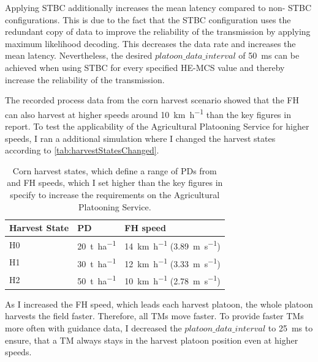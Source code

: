 Applying \ac{STBC} additionally increases the mean latency compared to
non- \ac{STBC} configurations.
This is due to the fact that the \ac{STBC} configuration uses the redundant copy of data to
improve the reliability of the transmission by applying maximum likelihood decoding.
This decreases the data rate and increases
the mean latency.
Nevertheless, the desired $platoon\_data\_interval$ of \SI{50}{\milli\second} can be achieved when using \ac{STBC} for
every specified \ac{HE}-\ac{MCS} value and thereby increase the reliability of the transmission.

The recorded process data from the corn harvest scenario showed that the \ac{FH} can also harvest at higher speeds around
\SI{10}{\kilo\meter\per\hour} than the key figures in \cite{faustzahlen2018} report.
To test the applicability of the Agricultural Platooning Service for higher speeds, I ran a additional simulation where I changed the
harvest states according to \autoref{tab:harvestStatesChanged}.

\begin{table}[H]
	\centering
	\begin{tabular}{>{\centering}p{2cm}p{4cm}p{4cm}}
		\toprule
		Harvest State & \ac{PD} & \ac{FH} speed\\
		\midrule
		H0 & \SI{20}{\tonne\per\hectare}
        & \SI{14}{\kilo\metre\per\hour} (\SI{3.89}{\metre\per\second}) \\
		H1 & \SI{30}{\tonne\per\hectare}
        & \SI{12}{\kilo\metre\per\hour} (\SI{3.33}{\metre\per\second}) \\
		H2 & \SI{50}{\tonne\per\hectare}
        & \SI{10}{\kilo\metre\per\hour} (\SI{2.78}{\metre\per\second}) \\
		\bottomrule
	\end{tabular}
	\caption{Corn harvest states, which define a range of \acf{PD}s from \cite{faustzahlen2018} and \acf{FH} speeds, which I set higher than the key figures in \cite{faustzahlen2018} specify to
	increase the requirements on the Agricultural Platooning Service.}
	\label{tab:harvestStatesChanged}
\end{table}

As I increased the \ac{FH} speed, which leads each harvest platoon, the whole platoon harvests the field faster.
Therefore, all \ac{TM}s move faster.
To provide faster \ac{TM}s more often with guidance data,
I decreased the $platoon\_data\_interval$ to \SI{25}{\milli\second} to ensure,
that a \ac{TM} always stays in the harvest platoon position even at higher speeds.

